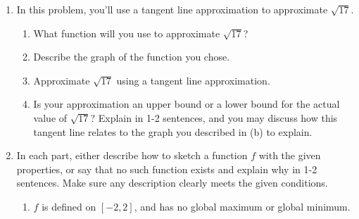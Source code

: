 \documentclass{article}
\begin{document}
\begin{enumerate}
\begin{problem}
         
         For full credit on this problem, please show your work fully and make sure to highlight the following:

  \begin{itemize}[nosep]
  \item State your goal.
  \item Given the diagram, clearly define your variables and label any constants.
  \item Communicate your thought process, one step at a time. Write down how you find and classify the global extrema, justifying that it is global extrema and not just a local max/min. 
  \item Be sure to answer the original question, asking for the dimensions of the page!
  \end{itemize}

\end{problem}
\newpage

\item 
In this problem, you'll use a tangent line approximation to approximate $\sqrt{17}$.
    \begin{enumerate}
        \item \begin{problem}
            What function will you use to approximate $\sqrt{17}$?
        \end{problem}
        \vspace{1in}
        \item \begin{problem}Describe the graph of the function you chose. 

        


        \end{problem}

          \newpage
        \item \begin{problem}Approximate $\sqrt{17}$ using a tangent line approximation. 
        \end{problem}
\vfill
       
        \item Is your approximation an upper bound or a lower bound for the actual value of $\sqrt{17}$? Explain in 1-2 sentences, and you may discuss how this tangent line relates to the graph you described in (b) to explain. 

        \vfill
    \end{enumerate}
\newpage
\item In each part, either describe how to sketch a function $f$ with the given properties, or say that no such function exists and explain why in 1-2 sentences. Make sure any description clearly meets the given conditions.
    \begin{enumerate}
    \item $f$ is defined on $[-2,2]$, and has no global maximum or global minimum.\\
   \vfill


\end{enumerate}
\end{enumerate}
\end{document}
